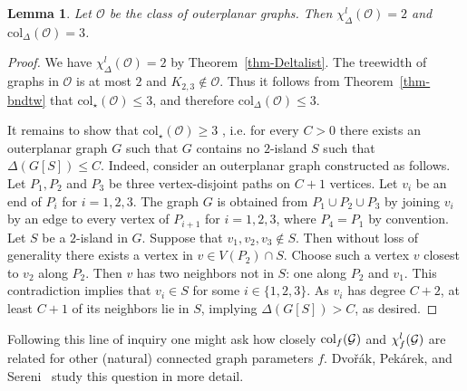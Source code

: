 \documentclass[12pt]{article}
\newcommand{\GG}{{\cal G}}
\newtheorem{lemma}[theorem]{Lemma}
\newcommand{\col}{\text{col}}
\newcommand{\mc}[1]{\mathcal{#1}}
\begin{document}
\begin{lemma}
Let $\mc{O}$ be the class of outerplanar graphs. Then $\chi^l_\Delta(\mc{O})=2$ and $ \col_\Delta(\mc{O})=3$.
\end{lemma} 
\begin{proof}
We have $\chi^l_\Delta(\mc{O})=2$ by Theorem~\ref{thm-Deltalist}. The treewidth of graphs in $\mc{O}$ is at most $2$ and $K_{2,3} \not \in \mc{O}$. Thus it follows from Theorem~\ref{thm-bndtw} that $\col_\star(\mc{O}) \leq 3$, and therefore $ \col_\Delta(\mc{O}) \leq 3$.

It remains to show that $\col_\star(\mc{O}) \geq 3$ , i.e. for every $C>0$ there exists an outerplanar graph $G$ such that $G$ contains no $2$-island $S$ such that $\Delta(G[S]) \leq C$. Indeed,  consider an outerplanar graph constructed as follows. 
Let $P_1,P_2$ and $P_3$ be three vertex-disjoint paths on $C+1$ vertices. Let $v_i$ be an end of $P_i$ for $i=1,2,3$. The graph $G$ is obtained from $P_1 \cup P_2 \cup P_3$ by joining $v_i$ by an edge to every vertex of $P_{i+1}$ for $i=1,2,3$, where $P_4=P_1$ by convention.
Let $S$ be a $2$-island in $G$. Suppose that $v_1,v_2,v_3 \not \in S$. Then without loss of generality there exists a vertex in $v \in V(P_2) \cap S$. Choose such a vertex $v$ closest to $v_2$ along $P_2$. Then $v$ has two neighbors not in $S$: one along $P_2$ and $v_1$. This contradiction implies that $v_i \in S$ for some $i \in \{1,2,3\}$. As $v_i$ has degree $C+2$, at least $C+1$ of its neighbors lie in $S$, implying $\Delta(G[S]) > C$, as desired.
\end{proof}

Following this line of inquiry one might ask how closely $\col_f(\GG)$ and $\chi^l_f(\GG)$ are related for other
(natural) connected graph parameters $f$.  Dvo\v{r}\'ak, Pek\'arek, and Sereni~\cite{colandch} study this question
in more detail.



\end{document}
